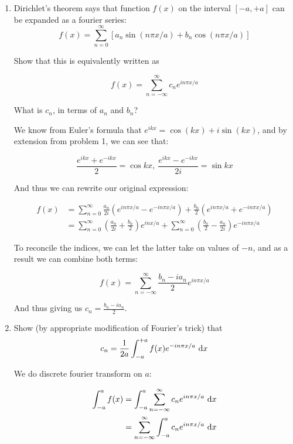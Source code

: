 \documentclass{article}
\begin{document}
\begin{enumerate}[label=(\alph*)]
    \item Dirichlet's theorem says that  function $f(x)$ on the interval $[-a, +a]$ can be expanded as a fourier series:
    \[ f(x) = \sum_{n = 0}^\infty [a_n \sin (n\pi x/a) + b_n\cos(n\pi x/a)] \]

    Show that this is equivalently written as 

    \[ f(x) = \sum_{n = -\infty}^\infty c_ne^{in\pi x/a}\]

    What is $c_n$, in terms of $a_n$ and $b_n$?


    \begin{solution}
        We know from Euler's formula that $e^{ikx} = \cos(kx) + i \sin(kx)$, and by extension from problem 1, we can see that:

        \[ \frac{e^{ikx} + e^{-ikx}}{2} =\cos kx, \ \frac{e^{ikx} - e^{-ikx}}{2i} = \sin kx\]
        
        
        And thus we can rewrite our original expression:


        \begin{align*}
            f(x) &= \sum_{n = 0}^\infty \frac{a_n}{2i} \left(e^{in \pi x/a} - e^{-in\pi x/a}\right) + \frac{b_n}{2} \left(e^{in \pi x/a} + e^{-in \pi x/a}\right)\\
            &= \sum_{n = 0}^\infty \left(\frac{a_n}{2i} + \frac{b_n}{2}\right)e^{inx/a} + \sum_{n = 0}^\infty \left(\frac{b_n}{2} - \frac{a_n}{2i}\right)e^{-in\pi x/a}
        \end{align*}

        To reconcile the indices, we can let the latter take on values of $-n$, and as a result we can combine both terms: 


        \[ f(x) = \sum_{n = -\infty}^\infty \frac{b_n - ia_n}{2}e^{in \pi x/a}\]

        And thus giving us $c_n = \frac{b_n - ia_n}{2}$.
    \end{solution}


    \item Show (by appropriate modification of Fourier's trick) that 
    \[ c_n = \frac{1}{2a}\int_{-a}^{+a} f(x) e^{-in\pi x/a} \ \mathrm d x\]

    \begin{solution}
        We do discrete fourier transform on $a$:

        \begin{align*}
            \int_{-a}^a f(x) &= \int_{-a}^{a} \sum_{n = -\infty}^\infty c_n e^{in \pi x/a} \ \mathrm d x\\
            &= \sum_{n = -\infty}^\infty \int_{-a}^a c_ne^{in \pi x/a} \ \mathrm d x\\
        \end{align*}


\end{solution}
\end{enumerate}
\end{document}
